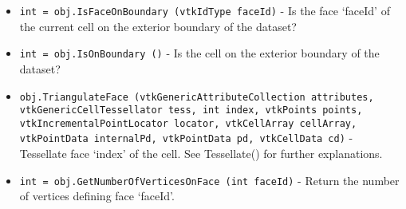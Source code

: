 \begin{itemize}
\item  \verb|int = obj.IsFaceOnBoundary (vtkIdType faceId)| -  Is the face `faceId' of the current cell on the exterior boundary of the
 dataset?
 

\item  \verb|int = obj.IsOnBoundary ()| -  Is the cell on the exterior boundary of the dataset?
 

\item  \verb|obj.TriangulateFace (vtkGenericAttributeCollection attributes, vtkGenericCellTessellator tess, int index, vtkPoints points, vtkIncrementalPointLocator locator, vtkCellArray cellArray, vtkPointData internalPd, vtkPointData pd, vtkCellData cd)| -  Tessellate face `index' of the cell. See Tessellate() for further
 explanations.
 
 
 
 
 
 
 
 
 

\item  \verb|int = obj.GetNumberOfVerticesOnFace (int faceId)| -  Return the number of vertices defining face `faceId'.
 
 
 

\end{itemize}

